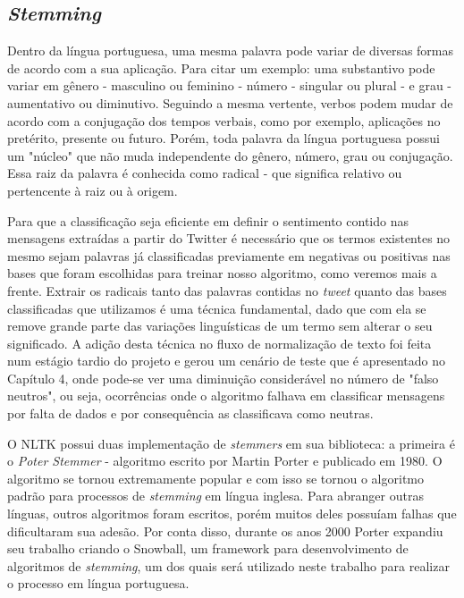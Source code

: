 \subsection{\textit{Stemming}}

Dentro da língua portuguesa, uma mesma palavra pode variar de diversas formas de acordo com a sua aplicação. Para citar um exemplo: uma substantivo pode variar em gênero - masculino ou feminino - número - singular ou plural - e grau - aumentativo ou diminutivo. Seguindo a mesma vertente, verbos podem mudar de acordo com a conjugação dos tempos verbais, como por exemplo, aplicações no pretérito, presente ou futuro.
Porém, toda palavra da língua portuguesa possui um "núcleo" que não muda independente do gênero, número, grau ou conjugação. Essa raiz da palavra é conhecida como radical - que significa relativo ou pertencente à raiz ou à origem. 

Para que a classificação seja eficiente em definir o sentimento contido nas mensagens extraídas a partir do Twitter é necessário que os termos existentes no mesmo sejam palavras já classificadas previamente em negativas ou positivas nas bases que foram escolhidas para treinar nosso algoritmo, como veremos mais a frente. Extrair os radicais tanto das palavras contidas no \textit{tweet} quanto das bases classificadas que utilizamos é uma técnica fundamental, dado que com ela se remove grande parte das variações linguísticas de um termo sem alterar o seu significado. A adição desta técnica no fluxo de normalização de texto foi feita num estágio tardio do projeto e gerou um cenário de teste que é apresentado no Capítulo 4, onde pode-se ver uma diminuição considerável no número de "falso neutros", ou seja, ocorrências onde o algoritmo falhava em classificar mensagens por falta de dados e por consequência as classificava como neutras.

O NLTK possui duas implementação de \textit{stemmers} em sua biblioteca: a primeira é o \textit{Poter Stemmer} - algoritmo escrito por Martin Porter e publicado em 1980. O algoritmo se tornou extremamente popular e com isso se tornou o algoritmo padrão para processos de \textit{stemming} em língua inglesa. Para abranger outras línguas, outros algoritmos foram escritos, porém muitos deles possuíam falhas que dificultaram sua adesão. Por conta disso, durante os anos 2000 Porter expandiu seu trabalho criando o Snowball\cite{snowball}, um framework para desenvolvimento de algoritmos de \textit{stemming}, um dos quais será utilizado neste trabalho para realizar o processo em língua portuguesa. 


